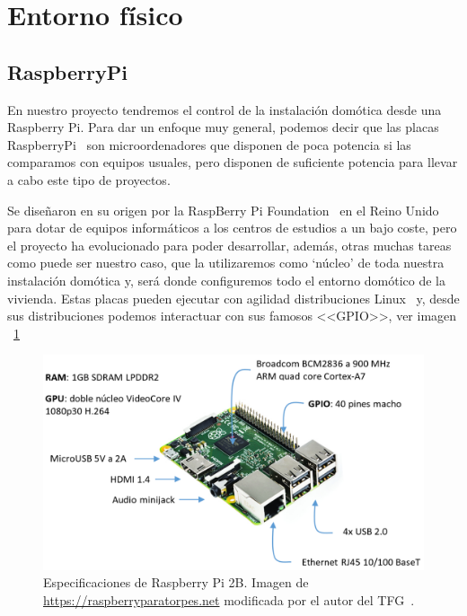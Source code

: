 \section{Entorno físico}
\subsection{RaspberryPi}
En nuestro proyecto tendremos el control de la instalación domótica desde una Raspberry Pi\cite{misc:RbPWeb}. 
Para dar un enfoque muy general, podemos decir que las placas RaspberryPi~\cite{misc:RbPWeb} son microordenadores que disponen de poca potencia si las comparamos con equipos usuales, pero disponen de suficiente potencia para llevar a cabo este tipo de proyectos.

Se diseñaron en su origen por la RaspBerry Pi Foundation~\cite{misc:RbPWeb} en el Reino Unido para dotar de equipos informáticos a los centros de estudios a un bajo coste, pero el proyecto ha evolucionado para poder desarrollar, además, otras muchas tareas como puede ser nuestro caso, que la utilizaremos como ‘núcleo’ de toda nuestra instalación domótica y, será donde configuremos todo el entorno domótico de la vivienda.
Estas placas pueden ejecutar con agilidad distribuciones Linux~\cite{misc:Linux} y, desde sus distribuciones podemos interactuar con sus famosos <<GPIO>>, ver imagen ~\ref{Img:Especificaciones RBP2B}

\begin{figure}
    \centering
    \includegraphics[width=\textwidth]{img/RBP2B.pdf}
    \caption[Especificaciones de Raspberry Pi 2B]{Especificaciones de Raspberry Pi 2B. Imagen de \url{https://raspberryparatorpes.net} modificada por el autor del TFG~\cite{wiki:Creative}. }\label{Img:Especificaciones RBP2B}
\end{figure}

